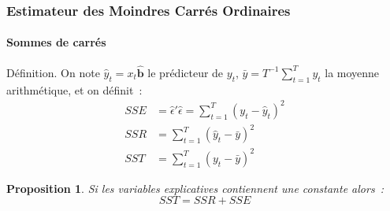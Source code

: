 \documentclass[10pt]{beamer}
\theoremstyle{plain}
\newenvironment{defn}[1]
{\bgroup \small\begin{block}{Définition. #1}}
  {\end{block}\egroup}
\newtheorem{prop}{Proposition}
\begin{document}
\begin{frame}
  \frametitle{Estimateur des Moindres Carrés Ordinaires}
  \framesubtitle{Sommes de carrés}

  \begin{defn}{}
    On note $\hat y_t = x_t \hat{\mathbf b}$ le prédicteur de $y_t$, $\bar y = T^{-1}\sum_{t=1}^T y_t$ la moyenne arithmétique, et on définit~:
    \[
      \begin{split}
        SSE &= \hat\epsilon'\hat\epsilon = \sum_{t=1}^T(y_t-\hat y_t)^2\\
        SSR &= \sum_{t=1}^T(\hat y_t-\bar y)^2\\
        SST &= \sum_{t=1}^T(y_t-\bar y)^2
      \end{split}
    \]
  \end{defn}

  \bigskip

  \begin{prop}\label{prop:SST_SSR_SSE}
    Si les variables explicatives contiennent une constante alors~:
    \[
    SST = SSR + SSE
  \]
  \end{prop}

\end{frame}
\end{document}

